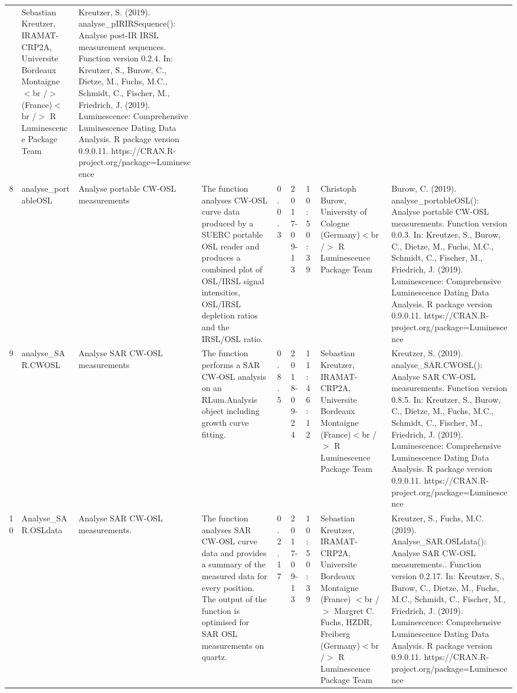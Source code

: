 \begin{table}[ht]
\begin{tabular}{rllllllll}
 & Sebastian Kreutzer, IRAMAT-CRP2A, Universite Bordeaux Montaigne$<$br /$>$ (France)$<$br /$>$  R Luminescence Package Team & Kreutzer, S. (2019). analyse\_pIRIRSequence(): Analyse post-IR IRSL measurement sequences. Function version 0.2.4. In: Kreutzer, S., Burow, C., Dietze, M., Fuchs, M.C., Schmidt, C., Fischer, M., Friedrich, J. (2019). Luminescence: Comprehensive Luminescence Dating Data Analysis. R package version 0.9.0.11. https://CRAN.R-project.org/package=Luminescence
 \\ 
  8 & analyse\_portableOSL & Analyse portable CW-OSL measurements & The function analyses CW-OSL curve data produced by a SUERC portable OSL reader and produces a combined plot of OSL/IRSL signal intensities, OSL/IRSL depletion ratios and the IRSL/OSL ratio. & 0.0.3 & 2017-09-13 & 10:50:39
 & Christoph Burow, University of Cologne (Germany)$<$br /$>$  R Luminescence Package Team & Burow, C. (2019). analyse\_portableOSL(): Analyse portable CW-OSL measurements. Function version 0.0.3. In: Kreutzer, S., Burow, C., Dietze, M., Fuchs, M.C., Schmidt, C., Fischer, M., Friedrich, J. (2019). Luminescence: Comprehensive Luminescence Dating Data Analysis. R package version 0.9.0.11. https://CRAN.R-project.org/package=Luminescence
 \\ 
  9 & analyse\_SAR.CWOSL & Analyse SAR CW-OSL measurements & The function performs a SAR CW-OSL analysis on an RLum.Analysis  object including growth curve fitting. & 0.8.5 & 2018-09-24 & 11:46:12
 & Sebastian Kreutzer, IRAMAT-CRP2A, Universite Bordeaux Montaigne (France)$<$br /$>$  R Luminescence Package Team & Kreutzer, S. (2019). analyse\_SAR.CWOSL(): Analyse SAR CW-OSL measurements. Function version 0.8.5. In: Kreutzer, S., Burow, C., Dietze, M., Fuchs, M.C., Schmidt, C., Fischer, M., Friedrich, J. (2019). Luminescence: Comprehensive Luminescence Dating Data Analysis. R package version 0.9.0.11. https://CRAN.R-project.org/package=Luminescence
 \\ 
  10 & Analyse\_SAR.OSLdata & Analyse SAR CW-OSL measurements. & The function analyses SAR CW-OSL curve data and provides a summary of the measured data for every position. The output of the function is optimised for SAR OSL measurements on quartz. & 0.2.17 & 2017-09-13 & 10:50:39
 & Sebastian Kreutzer, IRAMAT-CRP2A, Universite Bordeaux Montaigne (France) $<$br /$>$ Margret C. Fuchs, HZDR, Freiberg (Germany)$<$br /$>$  R Luminescence Package Team & Kreutzer, S., Fuchs, M.C. (2019). Analyse\_SAR.OSLdata(): Analyse SAR CW-OSL measurements.. Function version 0.2.17. In: Kreutzer, S., Burow, C., Dietze, M., Fuchs, M.C., Schmidt, C., Fischer, M., Friedrich, J. (2019). Luminescence: Comprehensive Luminescence Dating Data Analysis. R package version 0.9.0.11. https://CRAN.R-project.org/package=Luminescence

\end{tabular}
\end{table}

